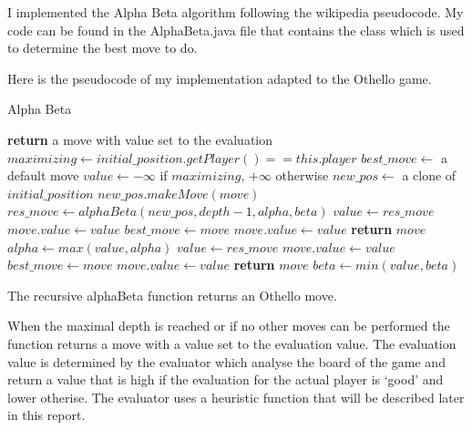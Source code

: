I implemented the Alpha Beta algorithm following the wikipedia pseudocode.
My code can be found in the AlphaBeta.java file that contains the class which is used to determine the best move to do.

Here is the pseudocode of my implementation adapted to the Othello game.

\FloatBarrier
\begin{algorithm}
    \caption{Alpha Beta}
    \begin{algorithmic}[1]
                \State \textbf{return} a move with value set to the evaluation
            \EndIf
            \State $maximizing \gets initial\_position.getPlayer() == this.player$
            \State $best\_move \gets$ a default move
            \State $value \gets -\infty$ if $maximizing$, $+\infty$ otherwise
                \State $new\_pos \gets$ a clone of $initial\_position$    
                \State $new\_pos.makeMove(move)$
                \State $res\_move \gets alphaBeta(new\_pos, depth - 1, alpha, beta)$
                        \State $value \gets res\_move$
                        \State $move.value \gets value$
                        \State $best\_move \gets move$
                    \EndIf
                        \State $move.value \gets value$
                        \State \textbf{return} $move$
                    \EndIf
                    \State $alpha \gets max(value, alpha)$
                \Else
                        \State $value \gets res\_move$
                        \State $move.value \gets value$
                        \State $best\_move \gets move$
                    \EndIf
                        \State $move.value \gets value$
                        \State \textbf{return} $move$
                    \EndIf
                    \State $beta \gets min(value, beta)$
                \EndIf
            \EndFor
        \EndProcedure
    \end{algorithmic}
\end{algorithm}
\FloatBarrier

The recursive alphaBeta function returns an Othello move.

When the maximal depth is reached or if no other moves can be performed the function returns a move with a value set to the evaluation value.
The evaluation value is determined by the evaluator which analyse the board of the game and return a value that is high if the evaluation for the actual player is `good' and lower otherise.
The evaluator uses a heuristic function that will be described later in this report.

